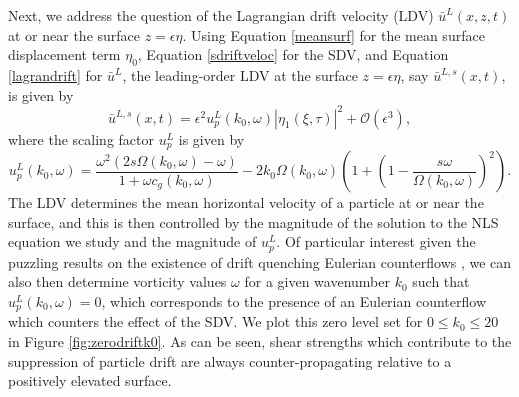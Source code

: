 \documentclass{JFM_Style/jfm}
\begin{document}
Next, we address the question of the Lagrangian drift velocity (LDV) $\bar{u}^{L}(x,z,t)$ at or near the surface $z=\epsilon \eta$.  Using Equation \eqref{meansurf} for the mean surface displacement term $\eta_{0}$, Equation \eqref{sdriftveloc} for the SDV, and Equation \eqref{lagrandrift} for $\bar{u}^{L}$, the leading-order LDV at the surface $z=\epsilon \eta$, say $\bar{u}^{L,s}(x,t)$, is given by
\[
\bar{u}^{L,s}(x,t) = \epsilon^{2} u^{L}_{p}(k_{0},\omega)|\eta_{1}(\xi,\tau)|^{2} + \mathcal{O}(\epsilon^{3}),
\]
where the scaling factor $u^{L}_{p}$ is given by 
\[
u^{L}_{p}(k_{0},\omega) =  \frac{ \omega^{2}(2s\Omega(k_{0},\omega) - \omega)}{1+\omega c_{g}(k_{0},\omega)} - 2k_{0}\Omega(k_{0},\omega)\left(1 + \left(1 - \frac{s\omega}{\Omega(k_{0},\omega)} \right)^{2}\right). 
\]
The LDV determines the mean horizontal velocity of a particle at or near the surface, and this is then controlled by the magnitude of the solution to the NLS equation we study and the magnitude of $u^{L}_{p}$.  Of particular interest given the puzzling results on the existence of drift quenching Eulerian counterflows \cite{monismith,smith}, we can also then determine vorticity values $\omega$ for a given wavenumber $k_{0}$ such that $u^{L}_{p}(k_{0},\omega) =0$, which corresponds to the presence of an Eulerian counterflow which counters the effect of the SDV.  We plot this zero level set for $0\leq k_{0}\leq 20$ in Figure \ref{fig:zerodriftk0}.  As can be seen, shear strengths which contribute to the suppression of particle drift are always counter-propagating relative to a positively elevated surface.  
\end{document}
